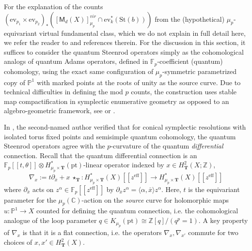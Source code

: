 \documentclass[reqno]{amsart}
\numberwithin{equation}{section}
\numberwithin{equation}{section}
\numberwithin{equation}{section}
\theoremstyle{definition}
\theoremstyle{remark}
\theoremstyle{remark}
\begin{document}
For the explanation of the counts $(\mathrm{ev}_{p_1} \times \mathrm{ev}_{p_2})_* \left( [\mathsf{M}_d(X)]^{vir}_{\mu_p} \cap \mathrm{ev}_k^* (\mathrm{St}(b)) \right)$ from the (hypothetical) $\mu_p$-equivariant virtual fundamental class, which we do not explain in full detail here, we refer the reader to \cite[Section 3.1.1]{bai-lee} and references therein. For the discussion in this section, it suffices to consider the quantum Steenrod operators simply as the cohomological analogs of quantum Adams operators, defined in $\mathbb{F}_p$-coefficient (quantum) cohomology, using the exact same configuration of $\mu_p$-symmetric parametrized copy of $\mathbb{P}^1$ with marked points at the roots of unity as the source curve. Due to technical difficulties in defining the mod $p$ counts, the construction uses stable map compactification in symplectic enumerative geometry as opposed to an algebro-geometric framework, see \cite[Section 4]{seidel-wilkins} or \cite[Section 2.4]{Lee23a}.



In \cite{Lee23b}, the second-named author verified that for conical symplectic resolutions with isolated torus fixed points and semisimple quantum cohomology, the quantum Steenrod operators agree with the $p$-curvature of the quantum  \emph{differential} connection.  Recall that the quantum differential connection is an $\mathbb{F}_p[\![t, \theta]\!] \otimes H^*_{\mu_p \times \mathbf{T}}(\mathrm{pt})$-linear operator indexed by $x \in H^2_\mathbf{T}(X;\mathbb{Z})$,
\begin{equation}\label{eqn:qconn}
    \nabla_x := t \partial_{\bar{x}} + x \ \star_\mathbf{T} : H^*_{\mu_p \times \mathbf{T}} (X) [\![z^{\mathrm{eff}}]\!] \to H^*_{\mu_p \times \mathbf{T}} (X) [\![z^{\mathrm{eff}}]\!]
\end{equation}
where $\partial_{\bar{x}}$ acts on $z^\alpha \in \mathbb{F}_p[\![z^{\mathrm{eff}}]\!]$ by $\partial_{\bar{x}} z^\alpha = \langle \alpha, \bar{x} \rangle z^\alpha$. Here, $t$ is the equivariant parameter for the $\mu_p(\mathbb{C})$-action on the \emph{source} curve for holomorphic maps $u : \mathbb{P}^1 \to X$ counted for defining the quantum connection, i.e. the cohomological analogue of the loop parameter $q \in K_{\mu_p}(\mathrm{pt}) \cong \mathbb{Z}[q]/(q^p=1)$. A key property of $\nabla_x$ is that it is a flat connection, i.e. the operators $\nabla_x, \nabla_{x'}$ commute for two choices of $x, x' \in H^2_{\mathbf{T}}(X)$.
\end{document}
